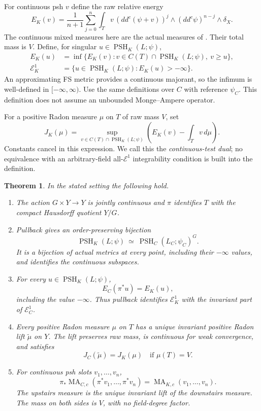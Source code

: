 \documentclass[11pt]{article}
\newtheorem{theorem}{Theorem}
\theoremstyle{remark}
\newcommand{\PSH}{\operatorname{PSH}}
\newcommand{\MA}{\operatorname{MA}}
\newcommand{\ddc}{dd^c}
\newcommand{\E}{\mathcal E}
\begin{document}
For continuous psh $v$ define the raw relative energy
\begin{equation}\label{eq:energy}
 E_K(v)=\frac1{n+1}\sum_{j=0}^{n}
 \int_T v\,(\ddc(\psi+v))^j\wedge(\ddc\psi)^{n-j}\wedge\delta_X.
\end{equation}
The continuous mixed measures here are the actual measures of
\cite[Theorem 8.4]{BE}. Their total mass is $V$. Define, for singular
$u\in\PSH_K(L;\psi)$,
\begin{equation}\label{eq:extended}
 \begin{aligned}
 E_K(u)&=\inf\{E_K(v):v\in C(T)\cap\PSH_K(L;\psi),\ v\geq u\},\\
 \E_K^1&=\{u\in\PSH_K(L;\psi):E_K(u)>-\infty\}.
 \end{aligned}
\end{equation}
An approximating FS metric provides a continuous majorant, so the
infimum is well-defined in $[-\infty,\infty)$. Use the same definitions
over $C$ with reference $\psi_C$. This definition does not assume an
unbounded Monge--Ampere operator.

For a positive Radon measure $\mu$ on $T$ of raw mass $V$, set
\begin{equation}\label{eq:dual}
 J_K(\mu)=\sup_{v\in C(T)\cap\PSH_K(L;\psi)}
 \left(E_K(v)-\int_T v\,d\mu\right).
\end{equation}
Constants cancel in this expression. We call this the
\emph{continuous-test dual}; no equivalence with an arbitrary-field
all-$\E^1$ integrability condition is built into the definition.

\begin{theorem}\label{thm:main}
In the stated setting the following hold.
\begin{enumerate}
\item The action $G\times Y\to Y$ is jointly continuous and
$\pi$ identifies $T$ with the compact Hausdorff quotient $Y/G$.
\item Pullback gives an order-preserving bijection
\[
 \PSH_K(L;\psi)\ \simeq\ \PSH_C(L_C;\psi_C)^G.
\]
It is a bijection of actual metrics at every point, including their
$-\infty$ values, and identifies the continuous subspaces.
\item For every $u\in\PSH_K(L;\psi)$,
\[
 E_C(\pi^*u)=E_K(u),
\]
including the value $-\infty$. Thus pullback identifies $\E_K^1$
with the invariant part of $\E_C^1$.
\item Every positive Radon measure $\mu$ on $T$ has a unique invariant
positive Radon lift $\widetilde\mu$ on $Y$. The lift preserves raw mass,
is continuous for weak convergence, and satisfies
\[
 J_C(\widetilde\mu)=J_K(\mu)\quad\text{if }\mu(T)=V.
\]
\item For continuous psh slots $v_1,\ldots,v_n$,
\[
 \pi_*\MA_{C,c}(\pi^*v_1,\ldots,\pi^*v_n)
 =\MA_{K,c}(v_1,\ldots,v_n).
\]
The upstairs measure is the unique invariant lift of the downstairs
measure. The mass on both sides is $V$, with no field-degree factor.
\end{enumerate}
\end{theorem}
\end{document}
